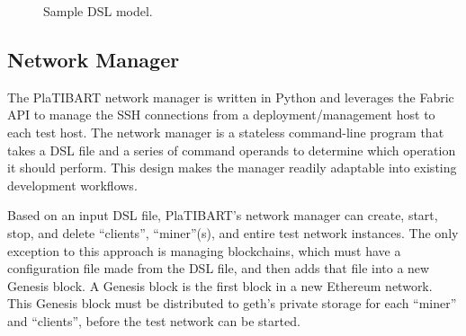 \begin{figure}[t]

\vspace{-0.12in}
\caption{Sample DSL model.}
\label{fig:model-sample}
\vspace{-0.15in}
\end{figure}

\subsection{Network Manager}
\label{networkmanager}

The PlaTIBART network manager is written in Python and leverages the Fabric API to manage the SSH connections from a deployment/management host to each test host. The network manager is a stateless command-line program that takes a DSL file and a series of command operands to determine which operation it should perform. This design makes the manager readily adaptable into existing development workflows. 

Based on an input DSL file, PlaTIBART's network manager can create, start, stop, and delete ``clients'', ``miner''(s), and entire test network instances. The only exception to this approach is managing blockchains, which must have a configuration file made from the DSL file, and then adds that file into a new Genesis block. A Genesis block is the first block in a new Ethereum network. This Genesis block must be distributed to geth's private storage for each ``miner'' and ``clients'', before the test network can be started.

